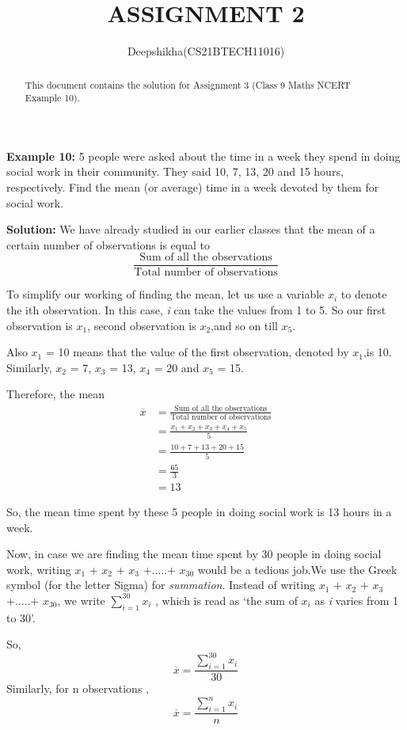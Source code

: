\documentclass[journal, 12pt, twocolumn]{IEEEtran}
\begin{document}
\title{ASSIGNMENT 2}
\author{Deepshikha(CS21BTECH11016)}
\maketitle

\begin{abstract}
This document contains the solution for Assignment 3 (Class 9 Maths NCERT Example 10).
\end{abstract}

\textbf{Example 10:}
5 people were asked about the time in a week they spend in doing
social work in their community. They said 10, 7, 13, 20 and 15 hours, respectively.
Find the mean (or average) time in a week devoted by them for social work.

\textbf{Solution:}
We have already studied in our earlier classes that the mean of a certain
number of observations is equal to\[\frac{\text{Sum of all the observations}}{\text{Total number of observations}}\]

To simplify our working of finding the mean, let us use a variable $x_i$
to denote the ith observation. In
this case, \emph{i} can take the values from 1 to 5. So our first observation is $x_1$, second
observation is $x_2$,and so on till $x_5$.

Also $x_1$ = 10 means that the value of the first observation, denoted by $x_1$,is 10.
Similarly, $x_2$ = 7, $x_3$ = 13, $x_4$ = 20 and $x_5$ = 15.

Therefore, the mean 
\begin{align}
\overline{x}&=\frac{\text{Sum of all the observations}}{\text{Total number of observations}}\\
    &=\frac{x_1 + x_2 + x_3 +x_4 +x_5}{5}\\
    &=\frac{10 + 7 + 13 + 20 + 15}{5}\\
    &=\frac{65}{3}\\
    &=13
\end{align}

So, the mean time spent by these 5 people in doing social work is 13 hours in a week.


Now, in case we are finding the mean time spent by 30 people in doing social
work, writing $x_1$ + $x_2$ + $x_3$ +.....+ $x_{30}$ would be a tedious job.We use the Greek symbol \textSigma (for the letter Sigma) for \emph{summation}.
Instead of writing $x_1$ + $x_2$ + $x_3$ +.....+ $x_{30}$, 
we write $\sum\limits_{i=1}^{30} x_i $ , which is read as ‘the sum of $x_i$ as \emph{i} varies from 1 to 30’.


So,
\begin{equation}
    \overline{x}=\frac{\sum\limits_{i=1}^{30} x_i}{30}\label{eq:6}
\end{equation}
Similarly, for n observations ,
\begin{equation}
    \overline{x}=\frac{\sum\limits_{i=1}^{n} x_i}{n}
\end{equation}
\end{document}

